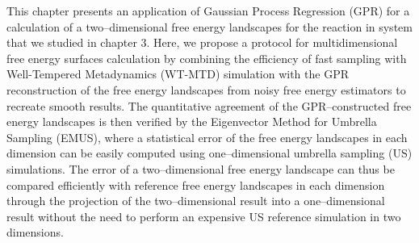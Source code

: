 \begin{spacing}{2.0}
    This chapter presents an application of Gaussian Process Regression (GPR) for a calculation of a two--dimensional free energy landscapes
    for the reaction in  system that we studied in chapter 3. Here, we propose a protocol for multidimensional free energy
    surfaces calculation by combining the efficiency of fast sampling with Well-Tempered Metadynamics (WT-MTD) simulation with the GPR 
    reconstruction of the free energy landscapes from noisy free energy estimators to recreate smooth results. The quantitative agreement
    of the GPR--constructed free energy landscapes is then verified by the Eigenvector Method for Umbrella Sampling (EMUS), where a statistical
    error of the free energy landscapes in each dimension can be easily computed using one--dimensional umbrella sampling (US) simulations.
    The error of a two--dimensional free energy landscape can thus be compared efficiently with reference free energy landscapes in each dimension
    through the projection of the two--dimensional result into a one--dimensional result without the need to perform an expensive US reference
    simulation in two dimensions.
\end{spacing}
